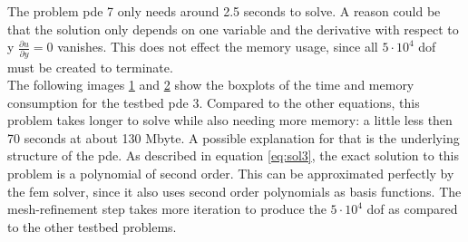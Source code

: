 \documentclass[./\jobname.tex]{subfiles}
\begin{document}
The problem \gls{pde} 7 only needs around 2.5 seconds to solve. A reason could be that the solution only depends on one variable and the derivative with respect to y $\frac{\partial u}{\partial y} = 0$ vanishes. This does not effect the memory usage, since all $5 \cdot 10^4$ \gls{dof} must be created to terminate. \\
The following images \ref{fig:_fem_time_boxplot_pde3} and \ref{fig:_fem_mem_boxplot_pde3} show the boxplots of the time and memory consumption for the testbed \gls{pde} 3. Compared to the other equations, this problem takes longer to solve while also needing more memory: a little less then 70 seconds at about 130 Mbyte. A possible explanation for that is the underlying structure of the \gls{pde}. As described in equation \ref{eq:sol3}, the exact solution to this problem is a polynomial of second order. This can be approximated perfectly by the \gls{fem} solver, since it also uses second order polynomials as basis functions. The mesh-refinement step takes more iteration to produce the $5 \cdot 10^4$ \gls{dof} as compared to the other testbed problems. 

\begin{figure}[H]
	\centering
	\noindent{}
	\label{fig:_fem_time_boxplot_pde3}
\end{figure}

\begin{figure}[H]
	\centering
	\noindent{}
	\label{fig:_fem_mem_boxplot_pde3}
\end{figure}
\end{document}
